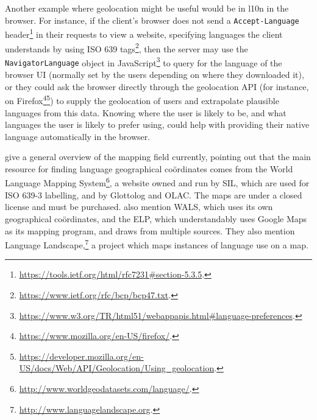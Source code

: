 Another example where geolocation might be useful would be in l10n in the browser. For instance, if the client's browser does not send a {\tt Accept-Language} header\footnote{\href{https://tools.ietf.org/html/rfc7231\#section-5.3.5}{https://tools.ietf.org/html/rfc7231\#section-5.3.5}. } in their requests to view a website, specifying languages the client understands by using ISO 639 tags\footnote{\href{https://www.ietf.org/rfc/bcp/bcp47.txt}{https://www.ietf.org/rfc/bcp/bcp47.txt}. }, then the server may use the {\tt NavigatorLanguage} object in JavaScript\footnote{\href{https://www.w3.org/TR/html51/webappapis.html\#language-preferences}{https://www.w3.org/TR/html51/webappapis.html\#language-preferences}. } to query for the language of the browser UI (normally set by the users depending on where they downloaded it), or they could ask the browser directly through the geolocation API (for instance, on Firefox\footnote{\href{https://www.mozilla.org/en-US/firefox/}{https://www.mozilla.org/en-US/firefox/}. }\footnote{\href{https://developer.mozilla.org/en-US/docs/Web/API/Geolocation/Using_geolocation}{https://developer.mozilla.org/en-US/docs/Web/API/Geolocation/Using\_geolocation}. }) to supply the geolocation of users and extrapolate plausible languages from this data. Knowing where the user is likely to be, and what languages the user is likely to prefer using, could help with providing their native language automatically in the browser.

\citet{gawne2016mapmaking} give a general overview of the mapping field currently, pointing out that the main resource for finding language geographical co\"ordinates comes from the World Language Mapping System\footnote{\href{http://www.worldgeodatasets.com/language/.}{http://www.worldgeodatasets.com/language/}. }, a website owned and run by SIL, which are used for ISO 639-3 labelling, and by Glottolog and OLAC. The maps are under a closed license and must be purchased. \citet{gawne2016mapmaking} also mention WALS, which uses its own geographical co\"ordinates, and the ELP, which understandably uses Google Maps as its mapping program, and draws from multiple sources. They also mention Language Landscape,\footnote{\href{http://www.languagelandscape.org/}{http://www.languagelandscape.org}. } a project which maps instances of language use on a map.

